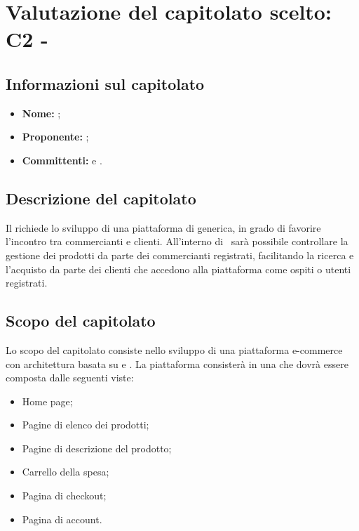 \section{Valutazione del capitolato scelto: C2 - \NomeProgetto}\label{C2}
\subsection{Informazioni sul capitolato}
\begin{itemize}
	\item \textbf{Nome:} \NomeProgetto{};
	\item \textbf{Proponente:} \Proponente;
	\item \textbf{Committenti:} \VT{} e \CR{}.
\end{itemize}

\subsection{Descrizione del capitolato}
Il  richiede lo sviluppo di una piattaforma di  generica, in grado di favorire l'incontro tra commercianti e clienti. All'interno di \NomeProgetto\ sarà possibile controllare la gestione dei prodotti da parte dei commercianti registrati, facilitando la ricerca e l'acquisto da parte dei clienti che accedono alla piattaforma come ospiti o utenti registrati.

\subsection{Scopo del capitolato}
Lo scopo del capitolato consiste nello sviluppo di una piattaforma e-commerce con architettura basata su  e .
La piattaforma consisterà in una  che dovrà essere composta dalle seguenti viste:
\begin{itemize}
	\item Home page;
	\item Pagine di elenco dei prodotti;
	\item Pagine di descrizione del prodotto;
	\item Carrello della spesa;
	\item Pagina di checkout;
	\item Pagina di account.
\end{itemize}

